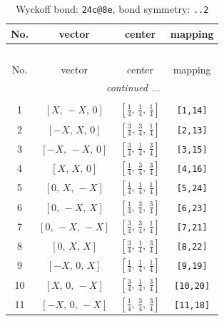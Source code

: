 \documentclass[fleqn,8pt]{jsarticle}
\begin{document}
\begin{longtable}{cccc}
\caption{Wyckoff bond: {\tt 24c@8e}, bond symmetry: {\tt ..2}}
 \\
 \hline \hline
No. & vector & center & mapping \\ \hline \endfirsthead

\multicolumn{3}{l}{\tablename\ \thetable{}} \\
 \hline \hline
No. & vector & center & mapping \\ \hline \endhead

 \hline \hline
\multicolumn{3}{r}{\footnotesize\it continued ...} \\ \endfoot

 \hline \hline
\multicolumn{3}{r}{} \\ \endlastfoot

1 & $\left[ X,\, - X,\, 0 \right]$ & $\left[ \frac{1}{4},\, \frac{1}{4},\, \frac{1}{4} \right]$ & {\tt [1,14]} \\ \hline
2 & $\left[ - X,\, X,\, 0 \right]$ & $\left[ \frac{3}{4},\, \frac{3}{4},\, \frac{1}{4} \right]$ & {\tt [2,13]} \\ \hline
3 & $\left[ - X,\, - X,\, 0 \right]$ & $\left[ \frac{3}{4},\, \frac{1}{4},\, \frac{3}{4} \right]$ & {\tt [3,15]} \\ \hline
4 & $\left[ X,\, X,\, 0 \right]$ & $\left[ \frac{1}{4},\, \frac{3}{4},\, \frac{3}{4} \right]$ & {\tt [4,16]} \\ \hline
5 & $\left[ 0,\, X,\, - X \right]$ & $\left[ \frac{1}{4},\, \frac{1}{4},\, \frac{1}{4} \right]$ & {\tt [5,24]} \\ \hline
6 & $\left[ 0,\, - X,\, X \right]$ & $\left[ \frac{1}{4},\, \frac{3}{4},\, \frac{3}{4} \right]$ & {\tt [6,23]} \\ \hline
7 & $\left[ 0,\, - X,\, - X \right]$ & $\left[ \frac{3}{4},\, \frac{3}{4},\, \frac{1}{4} \right]$ & {\tt [7,21]} \\ \hline
8 & $\left[ 0,\, X,\, X \right]$ & $\left[ \frac{3}{4},\, \frac{1}{4},\, \frac{3}{4} \right]$ & {\tt [8,22]} \\ \hline
9 & $\left[ - X,\, 0,\, X \right]$ & $\left[ \frac{1}{4},\, \frac{1}{4},\, \frac{1}{4} \right]$ & {\tt [9,19]} \\ \hline
10 & $\left[ X,\, 0,\, - X \right]$ & $\left[ \frac{3}{4},\, \frac{1}{4},\, \frac{3}{4} \right]$ & {\tt [10,20]} \\ \hline
11 & $\left[ - X,\, 0,\, - X \right]$ & $\left[ \frac{1}{4},\, \frac{3}{4},\, \frac{3}{4} \right]$ & {\tt [11,18]} \\ \hline

\end{longtable}
\end{document}
